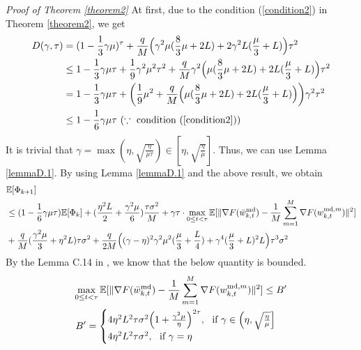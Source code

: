 \documentclass[11pt]{article}
\begin{document}
\emph{Proof of Theorem \ref{theorem2} } At first, due to the condition (\ref{condition2}) in Theorem \ref{theorem2}, we get
\begin{align*}
    D(\gamma, \tau) &= (1-\frac{1}{3}\gamma\mu)^\tau + \frac{q}{M}\Big( \gamma^2\mu(\frac{8}{3}\mu + 2L) + 2\gamma^2 L(\frac{\mu}{3} + L)\Big)\tau^2 \\
    &\leq 1-\frac{1}{3}\gamma\mu\tau + \frac{1}{9}\gamma^2\mu^2\tau^2 + \frac{q}{M}\gamma^2\Big(\mu(\frac{8}{3}\mu+2L)+2L(\frac{\mu}{3}+L)\Big)\tau^2 \\
    &= 1-\frac{1}{3}\gamma\mu\tau + \bigg( \frac{1}{9}\mu^2 +\frac{q}{M}\Big( \mu(\frac{8}{3}\mu +2L) + 2L(\frac{\mu}{3}+L)\Big)\bigg)\gamma^2\tau^2 \\
    &\leq 1 - \frac{1}{6}\gamma\mu\tau \textrm{ }(\because \textrm{ condition } (\ref{condition2}))
\end{align*}
It is trivial that $\gamma = \max(\eta, \sqrt{\frac{\eta}{\mu\tau}}) \in [\eta, \sqrt{\frac{\eta}{\mu}}]$. Thus, we can use Lemma \ref{lemmaD.1}. By using Lemma \ref{lemmaD.1} and the above result, we obtain
\begin{align} \label{ineqD.7-1}
    &\mathbb{E}[\Phi_{k+1}] \nonumber\\
    &\leq (1-\frac{1}{6}\gamma\mu\tau) \mathbb{E}[\Phi_k] + (\frac{\eta^2 L}{2} + \frac{\gamma^2\mu}{6})\frac{\tau\sigma^2}{M} + \gamma\tau \cdot \max_{0\leq t <\tau} \mathbb{E}[\|\nabla F(\Bar{w}_{k, t}^{\textrm{md}}) - \frac{1}{M} \sum_{m=1}^M \nabla F(w_{k, t}^{\textrm{md}, m})\|^2] \nonumber\\
    &+ \frac{q}{M}(\frac{\gamma^2\mu}{3}+\eta^2 L)\tau\sigma^2 + \frac{q}{2M}\Big( (\gamma-\eta)^2 \gamma^2\mu^2 (\frac{\mu}{3} + \frac{L}{4}) + \gamma^4 (\frac{\mu}{3} + L)^2 L \Big)\tau^3\sigma^2
\end{align}
By the Lemma C.14 in \cite{Yeojoon-yuan2020federated}, we know that the below quantity is bounded.
\begin{gather*}
    \max_{0\leq t <\tau} \mathbb{E}[\|\nabla F(\Bar{w}_{k, t}^{\textrm{md}}) - \frac{1}{M} \sum_{m=1}^M \nabla F(w_{k, t}^{\textrm{md}, m})\|^2] \leq B^\prime \\
    B^\prime=
    \begin{cases}
    4\eta^2 L^2\tau\sigma^2\Big(1+\frac{\gamma^2\mu}{\eta}\Big)^{2\tau},~\textrm{ if } \gamma \in \Big(\eta, \sqrt{\frac{\eta}{\mu}}\Big]\\
    4\eta^2 L^2\tau\sigma^2,~\textrm{ if } \gamma=\eta
    \end{cases}
\end{gather*}
\end{document}
